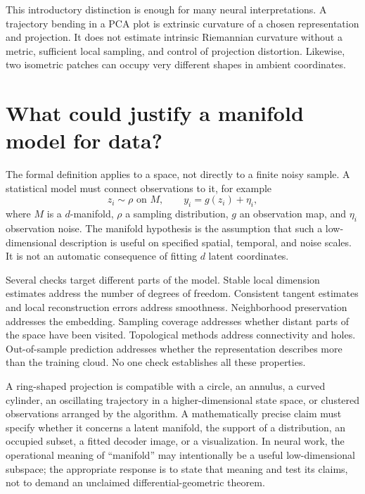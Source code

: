 This introductory distinction is enough for many neural interpretations. A trajectory bending in a PCA plot is extrinsic curvature of a chosen representation and projection. It does not estimate intrinsic Riemannian curvature without a metric, sufficient local sampling, and control of projection distortion. Likewise, two isometric patches can occupy very different shapes in ambient coordinates.

\section{What could justify a manifold model for data?}
The formal definition applies to a space, not directly to a finite noisy sample. A statistical model must connect observations to it, for example
\begin{equation}\label{eq:manifold-observation}
z_i\sim\rho\text{ on }M,\qquad y_i=g(z_i)+\eta_i,
\end{equation}
where $M$ is a $d$-manifold, $\rho$ a sampling distribution, $g$ an observation map, and $\eta_i$ observation noise. The manifold hypothesis is the assumption that such a low-dimensional description is useful on specified spatial, temporal, and noise scales. It is not an automatic consequence of fitting $d$ latent coordinates.

Several checks target different parts of the model. Stable local dimension estimates address the number of degrees of freedom. Consistent tangent estimates and local reconstruction errors address smoothness. Neighborhood preservation addresses the embedding. Sampling coverage addresses whether distant parts of the space have been visited. Topological methods address connectivity and holes. Out-of-sample prediction addresses whether the representation describes more than the training cloud. No one check establishes all these properties.

A ring-shaped projection is compatible with a circle, an annulus, a curved cylinder, an oscillating trajectory in a higher-dimensional state space, or clustered observations arranged by the algorithm. A mathematically precise claim must specify whether it concerns a latent manifold, the support of a distribution, an occupied subset, a fitted decoder image, or a visualization. In neural work, the operational meaning of ``manifold'' may intentionally be a useful low-dimensional subspace; the appropriate response is to state that meaning and test its claims, not to demand an unclaimed differential-geometric theorem.

